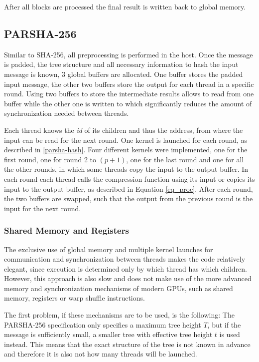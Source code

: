\documentclass[letterpaper]{article}
\begin{document}
After all blocks are processed the final result is written back to global memory.

\subsection{PARSHA-256}
Similar to SHA-256, all preprocessing is performed in the host. Once the message is padded, the tree structure and all necessary information to hash the input message is known, 3 global buffers are allocated. One buffer stores the padded input message, the other two buffers store the output for each thread in a specific round. Using two buffers to store the intermediate results allows to read from one buffer while the other one is written to which significantly reduces the amount of synchronization needed between threads.

Each thread knows the \emph{id} of its children and thus the address, from where the input can be read for the next round. One kernel is launched for each round, as described in \ref{parsha-hash}. Four different kernels were implemented, one for the first round, one for round 2 to $(p+1)$, one for the last round and one for all the other rounds, in which some threads copy the input to the output buffer.  In each round each thread calls the compression function using its input or copies its input to the output buffer, as described in Equation \ref{eq_proc}. After each round, the two buffers are swapped, such that the output from the previous round is the input for the next round. 

\subsubsection{Shared Memory and Registers}
The exclusive use of global memory and multiple kernel launches for communication and synchronization between threads makes the code relatively elegant, since execution is determined only by which thread has which children. However, this approach is also slow and does not make use of the more advanced memory and synchronization mechanisms of modern GPUs, such as shared memory, registers or warp shuffle instructions.

The first problem, if these mechanisms are to be used, is the following: The PARSHA-256 specification only specifies a maximum tree height $T$, but if the message is sufficiently small, a smaller tree with effective tree height $t$ is used instead. This means that the exact structure of the tree is not known in advance and therefore it is also not how many threads will be launched.
\end{document}

